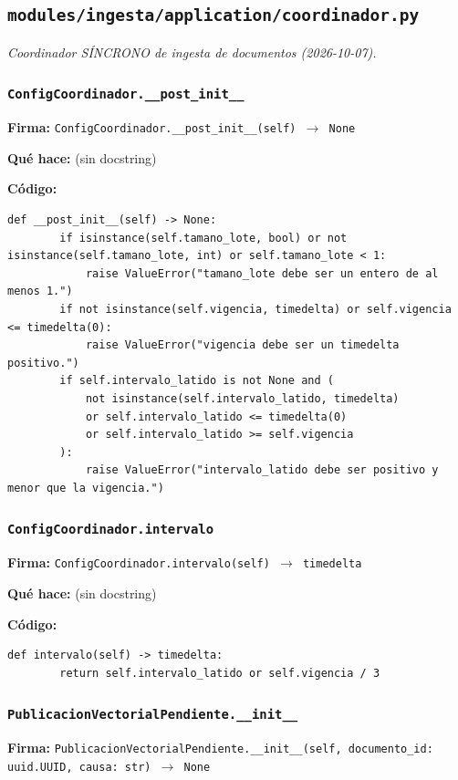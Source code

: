 \documentclass[11pt,a4paper]{article}
\begin{document}
\subsection{\texttt{modules/ingesta/application/coordinador.py}}
\textit{Coordinador SÍNCRONO de ingesta de documentos (2026-10-07).}

\subsubsection*{\texttt{ConfigCoordinador.\_\_post\_init\_\_}}
\textbf{Firma:} \texttt{ConfigCoordinador.\_\_post\_init\_\_(self) $\rightarrow$ None}

\textbf{Qué hace:} (sin docstring)

\textbf{Código:}
\begin{lstlisting}
def __post_init__(self) -> None:
        if isinstance(self.tamano_lote, bool) or not isinstance(self.tamano_lote, int) or self.tamano_lote < 1:
            raise ValueError("tamano_lote debe ser un entero de al menos 1.")
        if not isinstance(self.vigencia, timedelta) or self.vigencia <= timedelta(0):
            raise ValueError("vigencia debe ser un timedelta positivo.")
        if self.intervalo_latido is not None and (
            not isinstance(self.intervalo_latido, timedelta)
            or self.intervalo_latido <= timedelta(0)
            or self.intervalo_latido >= self.vigencia
        ):
            raise ValueError("intervalo_latido debe ser positivo y menor que la vigencia.")
\end{lstlisting}

\subsubsection*{\texttt{ConfigCoordinador.intervalo}}
\textbf{Firma:} \texttt{ConfigCoordinador.intervalo(self) $\rightarrow$ timedelta}

\textbf{Qué hace:} (sin docstring)

\textbf{Código:}
\begin{lstlisting}
def intervalo(self) -> timedelta:
        return self.intervalo_latido or self.vigencia / 3
\end{lstlisting}

\subsubsection*{\texttt{PublicacionVectorialPendiente.\_\_init\_\_}}
\textbf{Firma:} \texttt{PublicacionVectorialPendiente.\_\_init\_\_(self, documento\_id: uuid.UUID, causa: str) $\rightarrow$ None}
\end{document}
